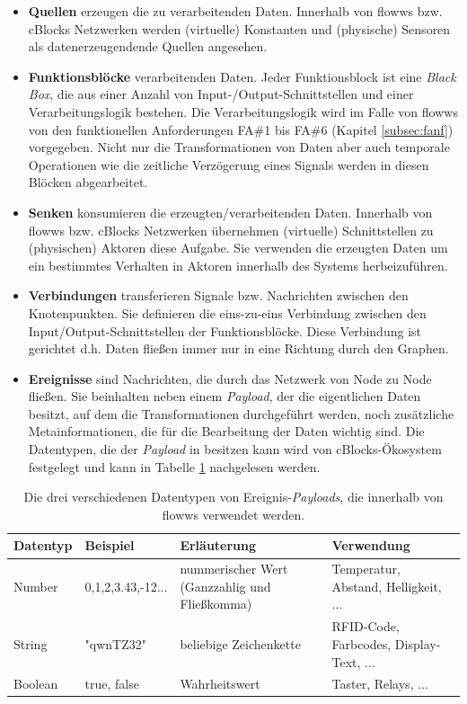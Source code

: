 \begin{itemize}
    \item \textbf{Quellen} erzeugen die zu verarbeitenden Daten. Innerhalb von flowws bzw. cBlocks Netzwerken werden (virtuelle) Konstanten und (physische) Sensoren als datenerzeugendende Quellen angesehen. 
    \item \textbf{Funktionsblöcke} verarbeitenden Daten. Jeder Funktionsblock ist eine \textit{Black Box}, die aus einer Anzahl von Input-/Output-Schnittstellen und einer Verarbeitungslogik bestehen. Die Verarbeitungslogik wird im Falle von flowws von den funktionellen Anforderungen FA\#1 bis FA\#6 (Kapitel \ref{subsec:fanf}) vorgegeben. Nicht nur die Transformationen von Daten aber auch temporale Operationen wie die zeitliche Verzögerung eines Signals werden in diesen Blöcken abgearbeitet. 
    \item \textbf{Senken} konsumieren die erzeugten/verarbeitenden Daten. Innerhalb von flowws bzw. cBlocks Netzwerken übernehmen (virtuelle) Schnittstellen zu (physischen) Aktoren diese Aufgabe. Sie verwenden die erzeugten Daten um ein bestimmtes Verhalten in Aktoren innerhalb des Systems herbeizuführen.
    \item \textbf{Verbindungen} transferieren Signale bzw. Nachrichten zwischen den Knotenpunkten. Sie definieren die eins-zu-eins Verbindung zwischen den Input/Output-Schnittstellen der Funktionsblöcke. Diese Verbindung ist gerichtet d.h. Daten fließen immer nur in eine Richtung durch den Graphen.
    \item \textbf{Ereignisse} sind Nachrichten, die durch das Netzwerk von Node zu Node fließen. Sie beinhalten neben einem \textit{Payload}, der die eigentlichen Daten besitzt, auf dem die Transformationen durchgeführt werden, noch zusätzliche Metainformationen, die für die Bearbeitung der Daten wichtig sind. Die Datentypen, die der \textit{Payload} in besitzen kann wird von cBlocks-Ökosystem festgelegt und kann in Tabelle \ref{tab:datentypenpayloads} nachgelesen werden.
\end{itemize}

 \begin{table}[h]
\caption{Die drei verschiedenen Datentypen von Ereignis-\textit{Payloads}, die innerhalb von flowws verwendet werden.}
\label{tab:datentypenpayloads}
\begin{tabularx}{\textwidth}{llXX}
\hline
\rowcolor[HTML]{EFEFEF} 
Datentyp & Beispiel &  Erläuterung &  Verwendung \\ \hline
Number & 0,1,2,3.43,-12...& nummerischer Wert (Ganzzahlig und Fließkomma) & Temperatur, Abstand, Helligkeit, ...   \\ \hline
String & "qwnTZ32" & beliebige Zeichenkette & RFID-Code, Farbcodes, Display-Text, ... \\ \hline
Boolean & true, false & Wahrheitswert & Taster, Relays, ... \\ \hline
\end{tabularx}
\end{table}


